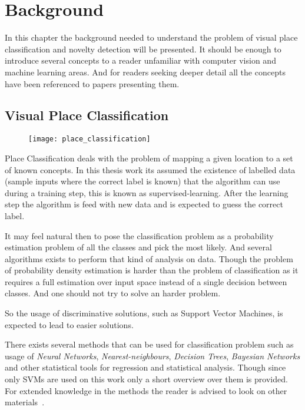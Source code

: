 \chapter{Background}
\label{chap:background}

In this chapter the background needed to understand the problem of visual place classification and novelty detection will be presented.
It should be enough to introduce several concepts to a reader unfamiliar with computer vision and machine learning areas.
And for readers seeking deeper detail all the concepts have been referenced to papers presenting them.

\section{Visual Place Classification}
\label{sec:place-classification}

\begin{figure}[here]
\begin{center}
\texttt{[image: place\_classification]}
\end{center}
\end{figure}

Place Classification deals with the problem of mapping a given location to a set of known concepts.
In this thesis work its assumed the existence of labelled data (sample inputs where the correct label is known) that the algorithm can use during a training step, this is known as supervised-learning.
After the learning step the algorithm is feed with new data and is expected to guess the correct label.

It may feel natural then to pose the classification problem as a probability estimation problem of all the classes and pick the most likely. And several algorithms exists to perform that kind of analysis on data.
Though the problem of probability density estimation is harder than the problem of classification as it requires a full estimation over input space instead of a single decision between classes.
And one should not try to solve an harder problem.

So the usage of discriminative solutions, such as Support Vector Machines, is expected to lead to easier solutions.

There exists several methods that can be used for classification problem such as usage of \emph{Neural Networks}, \emph{Nearest-neighbours}, \emph{Decision Trees}, \emph{Bayesian Networks} and other statistical tools for regression and statistical analysis.
Though since only \glspl{SVM} are used on this work only a short overview over them is provided. For extended knowledge in the methods the reader is advised to look on other materials~\citep{bishop2006pattern}.

